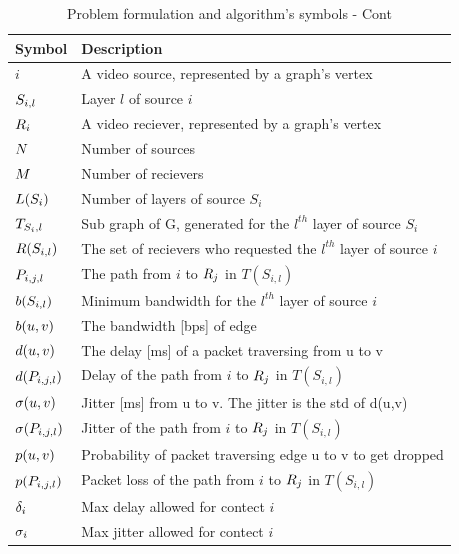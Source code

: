 \documentclass[a4paper, 10pt, conference]{ieeeconf}
\begin{document}
\begin{table}[ht]
\caption{Problem formulation and algorithm's symbols - Cont} 
\begin{center}
\label{tab:LISTOFABBREVIATIONS2}
\begin{tabular}{|p{1cm}|p{6cm}|}
\hline
    \textbf{Symbol} & \textbf{Description} \\
    \hline
		$\si{i}$ & A video source, represented by a graph's vertex \\\hline
		$S_{i,l}$ & Layer $l$ of source $\si{i}$ \\\hline
		$R_i$ & A video reciever, represented by a graph's vertex \\\hline
		$N$ & Number of sources \\\hline
		$M$ & Number of recievers \\\hline
		$L(S_i)$ & Number of layers of source $S_i$ \\\hline
		$T_{S_i,l}$ & Sub graph of G, generated for the $l^{th}$ layer of source $S_i$ \\\hline
		$R(S_{i,l})$	& The set of recievers who requested the $l^{th}$ layer of source $\si{i}$ \\\hline
		$P_{i,j,l}$ & The path from $\si{i}$ to $R_j$ in $T({S_{i,l}})$ \\\hline		
		$b(S_{i,l})$ & Minimum bandwidth for the $l^{th}$ layer of source $\si{i}$ \\\hline
		$b(u,v)$ & The bandwidth [bps] of edge \\\hline
		$d(u,v)$ & The delay [ms] of a packet traversing from u to v \\\hline
		$d(P_{i,j,l})$ & Delay of the path from $\si{i}$ to $R_j$ in $T({S_{i,l}})$ \\\hline
		$\sigma(u,v)$ & Jitter [ms] from u to v. The jitter is the std of d(u,v) \\\hline
		$\sigma(P_{i,j,l})$ & Jitter of the path from $\si{i}$ to $R_j$ in $T({S_{i,l}})$ \\\hline
		$p(u,v)$ & Probability of packet traversing edge u to v to get dropped \\\hline	
		$p(P_{i,j,l})$ & Packet loss of the path from $\si{i}$ to $R_j$ in $T({S_{i,l}})$ \\\hline
		$\delta_{i}$ & Max delay allowed for contect $i$ \\\hline
		$\sigma_{i}$ & Max jitter allowed for contect $i$ \\\hline
\end{tabular}
\end{center}
\end{table}
\end{document}
